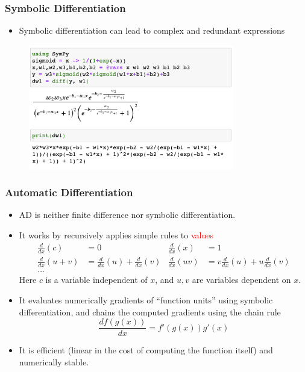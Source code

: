 \documentclass{beamer}
\begin{document}
\begin{frame}
\frametitle{Symbolic Differentiation}
\begin{itemize}
\item Symbolic differentiation can lead to complex and redundant expressions
\end{itemize}
	\begin{figure}[hbt]
		\centering
  \includegraphics[width=0.8\textwidth]{figures/symbolic}
\end{figure}
\end{frame}

\begin{frame}
	\frametitle{Automatic Differentiation}
	
	\begin{itemize}
		\item AD is neither finite difference nor symbolic differentiation. 
		 \item It works by recursively applies simple rules to \textcolor{red}{values}
		\begin{align*}
			\frac{d}{dx}(c) &= 0  & \frac{d}{dx}(x) &= 1\\
			\frac{d}{dx}(u+v) &= \frac{d}{dx}(u) + \frac{d}{dx}(v) & \frac{d}{dx}(uv) &= v\frac{d}{dx}(u)+u\frac{d}{dx}(v)\\
			\ldots
		\end{align*}
		Here $c$ is a variable independent of $x$, and $u, v$ are variables dependent on $x$.
		
		\item It evaluates numerically gradients of ``function units'' using symbolic differentiation, and chains the computed gradients using the chain rule
		$$\frac{df(g(x))}{dx} = f'(g(x)) g'(x)$$
		\item It is efficient (linear in the cost of computing the function itself) and numerically stable.  
	\end{itemize}
	
\end{frame}
\end{document}
